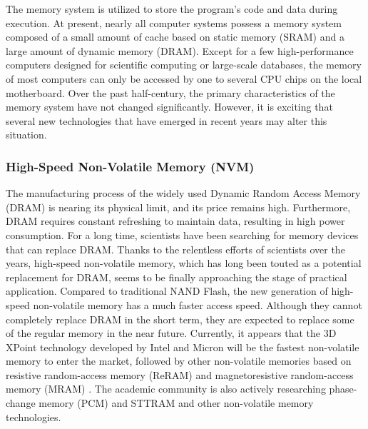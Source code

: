 The memory system is utilized to store the program's code and data during execution. At present, nearly all computer systems possess a memory system composed of a small amount of cache based on static memory (SRAM) and a large amount of dynamic memory (DRAM). Except for a few high-performance computers designed for scientific computing or large-scale databases, the memory of most computers can only be accessed by one to several CPU chips on the local motherboard. Over the past half-century, the primary characteristics of the memory system have not changed significantly. However, it is exciting that several new technologies that have emerged in recent years may alter this situation.

\subsubsection{High-Speed Non-Volatile Memory (NVM)}

The manufacturing process of the widely used Dynamic Random Access Memory (DRAM) is nearing its physical limit, and its price remains high. Furthermore, DRAM requires constant refreshing to maintain data, resulting in high power consumption. For a long time, scientists have been searching for memory devices that can replace DRAM. Thanks to the relentless efforts of scientists over the years, high-speed non-volatile memory, which has long been touted as a potential replacement for DRAM, seems to be finally approaching the stage of practical application. Compared to traditional NAND Flash, the new generation of high-speed non-volatile memory has a much faster access speed. Although they cannot completely replace DRAM in the short term, they are expected to replace some of the regular memory in the near future. Currently, it appears that the 3D XPoint technology developed by Intel and Micron \cite{3d-xpoint} will be the fastest non-volatile memory to enter the market, followed by other non-volatile memories based on resistive random-access memory (ReRAM) \cite{akinaga2010resistive} and magnetoresistive random-access memory (MRAM) \cite{tehrani1999progress}. The academic community is also actively researching phase-change memory (PCM) \cite{raoux2008phase,lee2010phase} and STTRAM \cite{kultursay2013evaluating,apalkov2013spin} and other non-volatile memory technologies.

